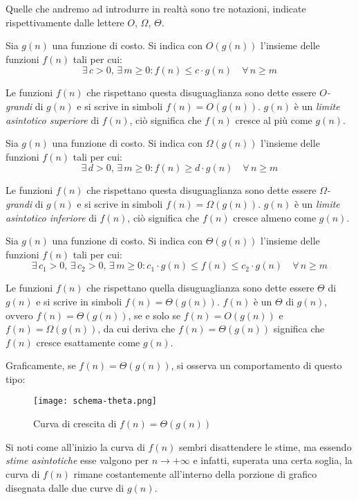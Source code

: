 Quelle che andremo ad introdurre in realtà sono tre notazioni, indicate
rispettivamente dalle lettere $O$, $\Omega$, $\Theta$.

\begin{definition}[Notazione $O$]
    Sia $g(n)$ una funzione di costo. Si indica con $O(g(n))$ l'insieme delle
    funzioni $f(n)$ tali per cui:
    \[\exists\,c>0,\,\exists\,m\geq0:f(n)\leq c\cdot g(n)\quad\forall\,n\geq m\]
\end{definition}\noindent
Le funzioni $f(n)$ che rispettano questa disuguaglianza sono dette essere
\emph{$O$-grandi} di $g(n)$ e si scrive in simboli $f(n)=O(g(n))$. $g(n)$ è un
\emph{limite asintotico superiore} di $f(n)$, ciò significa che $f(n)$ cresce
al più come $g(n)$.\newpage

\begin{definition}
    Sia $g(n)$ una funzione di costo. Si indica con $\Omega(g(n))$ l'insieme
    delle funzioni $f(n)$ tali per cui:
    \[\exists\,d>0,\,\exists\,m\geq0:f(n)\geq d\cdot g(n)\quad\forall\,n\geq m\]
\end{definition}\noindent
Le funzioni $f(n)$ che rispettano questa disuguaglianza sono dette essere
\emph{$\Omega$-grandi} di $g(n)$ e si scrive in simboli $f(n)=\Omega(g(n))$.
$g(n)$ è un \emph{limite asintotico inferiore} di $f(n)$, ciò significa che $f(n)$
cresce almeno come $g(n)$.

\begin{definition}
    Sia $g(n)$ una funzione di costo. Si indica con $\Theta(g(n))$ l'insieme
    delle funzioni $f(n)$ tali per cui: 
    \[\exists\,c_1>0,\,\exists\,c_2>0,\,\exists\,m\geq0:
    c_1\cdot g(n)\leq f(n)\leq c_2\cdot g(n)\quad\forall\,n\geq m\]
\end{definition}\noindent
Le funzioni $f(n)$ che rispettano quella disuguaglianza sono dette essere
$\Theta$ di $g(n)$ e si scrive in simboli $f(n)=\Theta(g(n))$.
$f(n)$ è un $\Theta$ di $g(n)$, ovvero $f(n)=\Theta(g(n))$, se e solo se
$f(n)=O(g(n))$ e $f(n)=\Omega(g(n))$, da cui deriva che $f(n)=\Theta(g(n))$
significa che $f(n)$ cresce esattamente come $g(n)$.

\bigskip\noindent
Graficamente, se $f(n)=\Theta(g(n))$, si osserva un comportamento di questo tipo:

\begin{figure}[htbp]
    \centering
    \texttt{[image: schema-theta.png]}
    \caption{Curva di crescita di $f(n)=\Theta(g(n))$}
\end{figure}\noindent
Si noti come all'inizio la curva di $f(n)$ sembri disattendere le stime, ma
essendo \emph{stime asintotiche} esse valgono per $n\to+\infty$ e infatti,
superata una certa soglia, la curva di $f(n)$ rimane costantemente all'interno
della porzione di grafico disegnata dalle due curve di $g(n)$.

